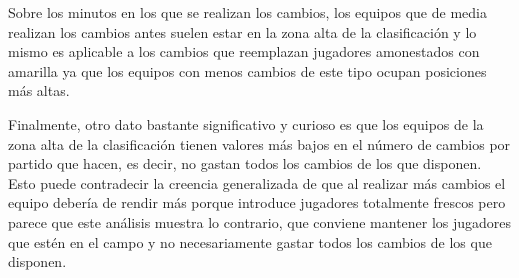 Sobre los minutos en los que se realizan los cambios, los equipos que de media realizan los 
cambios antes suelen estar en la zona alta de la clasificación y lo mismo es aplicable a los cambios 
que reemplazan jugadores amonestados con amarilla ya que los equipos con menos cambios de 
este tipo ocupan posiciones más altas.

Finalmente, otro dato bastante significativo y curioso es que los equipos de la zona alta de la 
clasificación tienen valores más bajos en el número de cambios por partido que hacen, es decir, 
no gastan todos los cambios de los que disponen. Esto puede contradecir la creencia generalizada 
de que al realizar más cambios el equipo debería de rendir más porque introduce jugadores 
totalmente frescos pero parece que este análisis muestra lo contrario, que conviene mantener los 
jugadores que estén en el campo y no necesariamente gastar todos los cambios de los que 
disponen.
